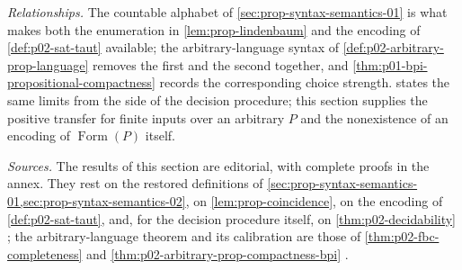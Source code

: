 \emph{Relationships.}
The countable alphabet of \cref{sec:prop-syntax-semantics-01} is what makes
both the enumeration in \cref{lem:prop-lindenbaum} and the encoding of
\cref{def:p02-sat-taut} available; the arbitrary-language syntax of
\cref{def:p02-arbitrary-prop-language} removes the first and the second
together, and \cref{thm:p01-bpi-propositional-compactness} records the
corresponding choice strength.   states the
same limits from the side of the decision procedure; this section supplies
the positive transfer for finite inputs over an arbitrary \(P\) and the
nonexistence of an encoding of \(\operatorname{Form}(P)\) itself.

\emph{Sources.}  The results of this section are editorial, with complete
proofs in the annex.  They rest on the restored definitions of
\cref{sec:prop-syntax-semantics-01,sec:prop-syntax-semantics-02}, on
\cref{lem:prop-coincidence}, on the encoding of \cref{def:p02-sat-taut}, and,
for the decision procedure itself, on \cref{thm:p02-decidability}
\parencite{EbbinghausFlumThomas1994}; the arbitrary-language theorem and its
calibration are those of \cref{thm:p02-fbc-completeness} and
\cref{thm:p02-arbitrary-prop-compactness-bpi} \parencite{HowardRubin1998}.

